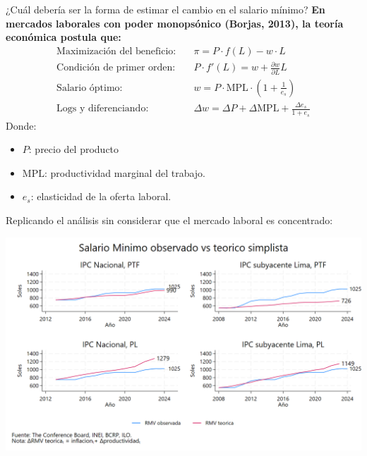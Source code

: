 \documentclass{beamer}
\begin{document}
\begin{frame}{¿Cuál debería ser la forma de estimar el cambio en el salario mínimo?}
    \textbf{En mercados laborales con poder monopsónico (Borjas, 2013), la teoría económica postula que:}
    \begin{align*}
        \text{Maximización del beneficio:} \quad & \pi = P \cdot f(L) - w \cdot L \\
        \text{Condición de primer orden:} \quad & P \cdot f'(L) = w + \frac{\partial w}{\partial L} L \\
        \text{Salario óptimo:} \quad & w = P \cdot \text{MPL} \cdot \left( 1 + \frac{1}{e_s} \right) \\
        \text{Logs y diferenciando:} \quad & \Delta w = \Delta P + \Delta \text{MPL} + \frac{\Delta {e_s}}{1+e_s}
    \end{align*}
    Donde:
    \begin{itemize}
        \item $P$: precio del producto
        \item $\text{MPL}$: productividad marginal del trabajo.
        \item $e_s$: elasticidad de la oferta laboral.
    \end{itemize}
\end{frame}

\begin{frame}{Replicando el análisis sin considerar que el mercado laboral es concentrado:}
    \begin{center}
        \includegraphics[width=\linewidth]{rmv_determination_sine.png}
    \end{center}
\end{frame}
\end{document}
